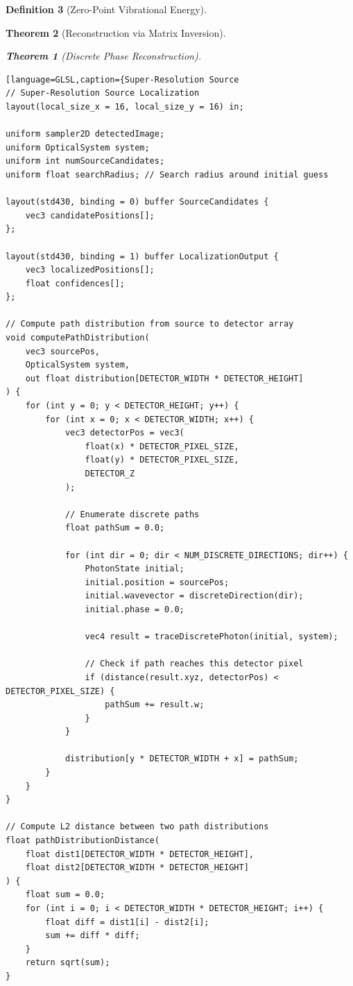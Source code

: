 \documentclass[11pt,a4paper]{article}
\newtheorem{theorem}{Theorem}[section]
\theoremstyle{definition}
\newtheorem{definition}[theorem]{Definition}
\theoremstyle{remark}
\begin{document}
\begin{definition}[Zero-Point Vibrational Energy]
\begin{theorem}[Reconstruction via Matrix Inversion]
\begin{theorem}[Discrete Phase Reconstruction]
\begin{lstlisting}[language=GLSL,caption={Super-Resolution Source
// Super-Resolution Source Localization
layout(local_size_x = 16, local_size_y = 16) in;

uniform sampler2D detectedImage;
uniform OpticalSystem system;
uniform int numSourceCandidates;
uniform float searchRadius; // Search radius around initial guess

layout(std430, binding = 0) buffer SourceCandidates {
    vec3 candidatePositions[];
};

layout(std430, binding = 1) buffer LocalizationOutput {
    vec3 localizedPositions[];
    float confidences[];
};

// Compute path distribution from source to detector array
void computePathDistribution(
    vec3 sourcePos,
    OpticalSystem system,
    out float distribution[DETECTOR_WIDTH * DETECTOR_HEIGHT]
) {
    for (int y = 0; y < DETECTOR_HEIGHT; y++) {
        for (int x = 0; x < DETECTOR_WIDTH; x++) {
            vec3 detectorPos = vec3(
                float(x) * DETECTOR_PIXEL_SIZE,
                float(y) * DETECTOR_PIXEL_SIZE,
                DETECTOR_Z
            );
            
            // Enumerate discrete paths
            float pathSum = 0.0;
            
            for (int dir = 0; dir < NUM_DISCRETE_DIRECTIONS; dir++) {
                PhotonState initial;
                initial.position = sourcePos;
                initial.wavevector = discreteDirection(dir);
                initial.phase = 0.0;
                
                vec4 result = traceDiscretePhoton(initial, system);
                
                // Check if path reaches this detector pixel
                if (distance(result.xyz, detectorPos) < DETECTOR_PIXEL_SIZE) {
                    pathSum += result.w;
                }
            }
            
            distribution[y * DETECTOR_WIDTH + x] = pathSum;
        }
    }
}

// Compute L2 distance between two path distributions
float pathDistributionDistance(
    float dist1[DETECTOR_WIDTH * DETECTOR_HEIGHT],
    float dist2[DETECTOR_WIDTH * DETECTOR_HEIGHT]
) {
    float sum = 0.0;
    for (int i = 0; i < DETECTOR_WIDTH * DETECTOR_HEIGHT; i++) {
        float diff = dist1[i] - dist2[i];
        sum += diff * diff;
    }
    return sqrt(sum);
}


\end{lstlisting}
\end{theorem}
\end{theorem}
\end{definition}
\end{document}
